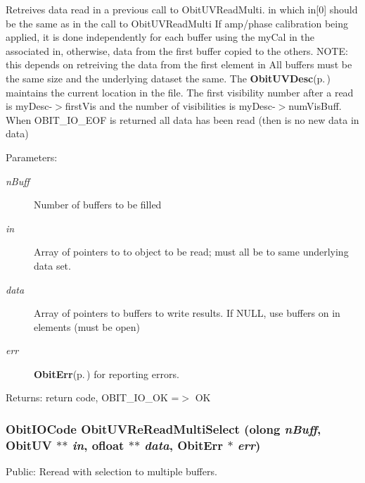 Retreives data read in a previous call to Obit\-UVRead\-Multi. in which in[0] should be the same as in the call to Obit\-UVRead\-Multi If amp/phase calibration being applied, it is done independently for each buffer using the my\-Cal in the associated in, otherwise, data from the first buffer copied to the others. NOTE: this depends on retreiving the data from the first element in All buffers must be the same size and the underlying dataset the same. The {\bf Obit\-UVDesc}{\rm (p.\,\pageref{structObitUVDesc})} maintains the current location in the file. The first visibility number after a read is my\-Desc-$>$first\-Vis and the number of visibilities is my\-Desc-$>$num\-Vis\-Buff. When OBIT\_\-IO\_\-EOF is returned all data has been read (then is no new data in data) \begin{Desc}
\item[Parameters:]
\begin{description}
\item[{\em n\-Buff}]Number of buffers to be filled \item[{\em in}]Array of pointers to to object to be read; must all be to same underlying data set. \item[{\em data}]Array of pointers to buffers to write results. If NULL, use buffers on in elements (must be open) \item[{\em err}]{\bf Obit\-Err}{\rm (p.\,\pageref{structObitErr})} for reporting errors. \end{description}
\end{Desc}
\begin{Desc}
\item[Returns:]return code, OBIT\_\-IO\_\-OK =$>$ OK \end{Desc}
\subsubsection{\setlength{\rightskip}{0pt plus 5cm}Obit\-IOCode Obit\-UVRe\-Read\-Multi\-Select ({\bf olong} {\em n\-Buff}, {\bf Obit\-UV} $\ast$$\ast$ {\em in}, {\bf ofloat} $\ast$$\ast$ {\em data}, {\bf Obit\-Err} $\ast$ {\em err})}\label{ObitUV_8c_a27}


Public: Reread with selection to multiple buffers. 

